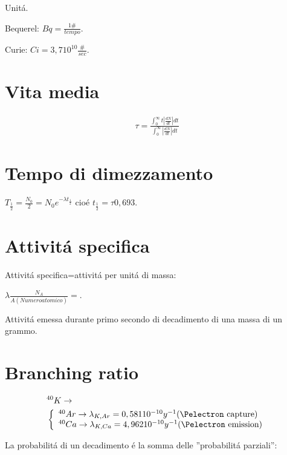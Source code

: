Unit\'a.

Bequerel:
$Bq=\frac{1 \#}{tempo}$.

Curie:
$Ci=3,7 10^{10} \frac{\#}{sec}$.

\section{Vita media}
\begin{align*}
\tau=\frac{\int_0^{\infty}t|\frac{dN}{dt}|dt}{\int_0^{\infty}|\frac{dN}{dt}|dt}
\end{align*}

\section{Tempo di dimezzamento}
$T_{\frac{1}{2}}=\frac{N_0}{2}=N_0e^{-\lambda t_{\frac{1}{2}}}$ cio\'e $t_{\frac{1}{2}}=\tau 0,693$.

\section{Attivit\'a specifica}

Attivit\'a specifica=attivit\'a per unit\'a di massa:

$\lambda\frac{N_A}{A(Numero atomico)}=$.

Attivit\'a emessa durante primo secondo di decadimento di una massa di un grammo.

\section{Branching ratio}

\begin{align*}
&^{40}K\to\\
&\left\{\begin{array}{l} ^{40}Ar \to \lambda_{K,Ar}=0,581 10^{-10} y^{-1} \text{(\Pelectron capture)} \\ ^{40}Ca \to \lambda_{K,Ca}=4,962 10^{-10} y^{-1} \text{(\Pelectron emission)}\\ \end{array} \right.\\
\end{align*}

La probabilit\'a di un decadimento \'e la somma delle ''probabilit\'a parziali'':


